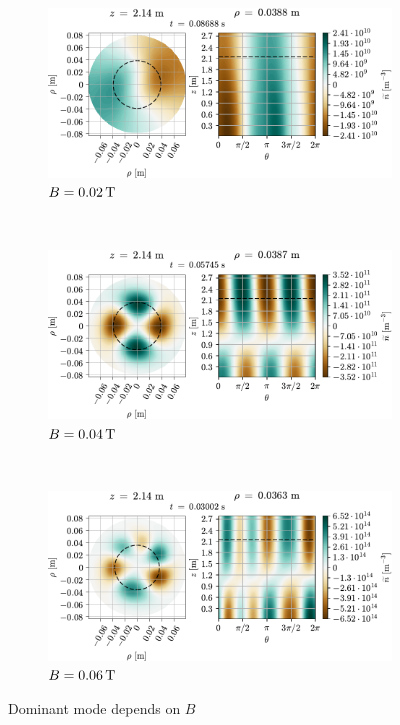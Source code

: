 {
\clearpage
\thispagestyle{empty}
\begin{figure}[htbp]
    \vspace*{-1cm}
    \centering
    \begin{subfigure}[h]{1.00\textwidth}
        \centering
        \includegraphics{fig/results/modesDiffScanVals/B002}
        \caption{$B=0.02 \, \text{T}$}
        \label{fig:B002}
    \end{subfigure}%
    \\
    \begin{subfigure}[h]{1.00\textwidth}
        \centering
        \includegraphics{fig/results/modesDiffScanVals/B004}
        \caption{$B=0.04 \, \text{T}$}
        \label{fig:B004}
    \end{subfigure}
    \\
    \begin{subfigure}[h]{1.00\textwidth}
        \centering
        \includegraphics{fig/results/modesDiffScanVals/B006}
        \caption{$B=0.06 \, \text{T}$}
        \label{fig:B006}
    \end{subfigure}
    \caption{Dominant mode depends on $B$}
    \label{fig:dominatingMode}
\end{figure}
\clearpage
}
%

